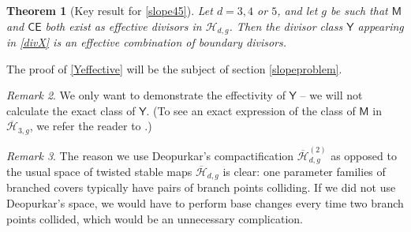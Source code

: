 \documentclass[reqno, 10 pt]{article}
\newtheorem{thm}{Theorem}
\theoremstyle{definition}
\theoremstyle{remark}
\newtheorem{rmk}[thm]{Remark}
\numberwithin{equation}{section}
\numberwithin{thm}{section}
\numberwithin{prop}{section}
\numberwithin{lem}{section}
\numberwithin{cor}{section}
\numberwithin{conj}{section}
\numberwithin{defn}{section}
\renewcommand{\H}{\mathcal H}
\newcommand{\Hdg}{\overline{\H}_{d,g}}
\newcommand{\Hdgnt}{\overline{\H}_{d,g}^{(2)}}
\newcommand{\sfY}{{\mathsf Y}}
\newcommand{\sfCE}{{\mathsf {CE}}}
\newcommand{\sfM}{{\mathsf M}}
\renewcommand{\H}{{\mathcal{H}}}
\begin{document}
\begin{thm}[Key result for \autoref{slope45}]\label{Yeffective}
Let $d=3, 4$ or $5$, and let $g$ be such that $\sfM$ and $\sfCE$ both exist as  effective divisors in $\H_{d,g}$.  Then the divisor class $\sfY$ appearing in \eqref{divX} is an effective combination of boundary divisors.
\end{thm}

The proof of \autoref{Yeffective} will be the subject of section \ref{slopeproblem}. 

\begin{rmk}
We only want to demonstrate the effectivity of ${\sfY}$ -- we will not calculate the exact class of ${\sfY}$.  (To see an exact expression of the class of ${\sfM}$ in $\overline{\H}_{3,g}$, we refer the reader to \cite{deopurkar_patel:sharp_trigonal}.)
\end{rmk}

\begin{rmk}  The reason we use Deopurkar's compactification $\Hdgnt$ as opposed to the usual space of twisted stable maps $\Hdg$ is clear:  one parameter families of branched covers typically have pairs of branch points colliding.  If we did not use Deopurkar's space, we would have to perform base changes every time two branch points collided, which would be an unnecessary complication.
\end{rmk}
\end{document}
